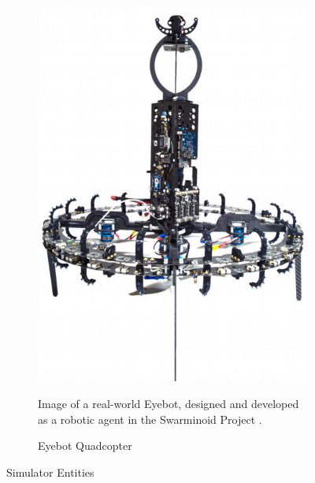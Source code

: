 \documentclass{report}
\begin{document}
\begin{figure}
\begin{subfigure}{0.4\textwidth}
		\includegraphics[width=\textwidth]{images/EyebotCarbonFrame}
		\caption{Eyebot Quadcopter}
		\label{fig:eyebot_hardware}
		{Image of a real-world Eyebot, designed and developed as a robotic agent in the Swarminoid Project \cite{Dorigo2013}}.
	\end{subfigure}
	\caption{Simulator Entities}
	\label{fig:sim_orig}
\end{figure}
\end{document}
